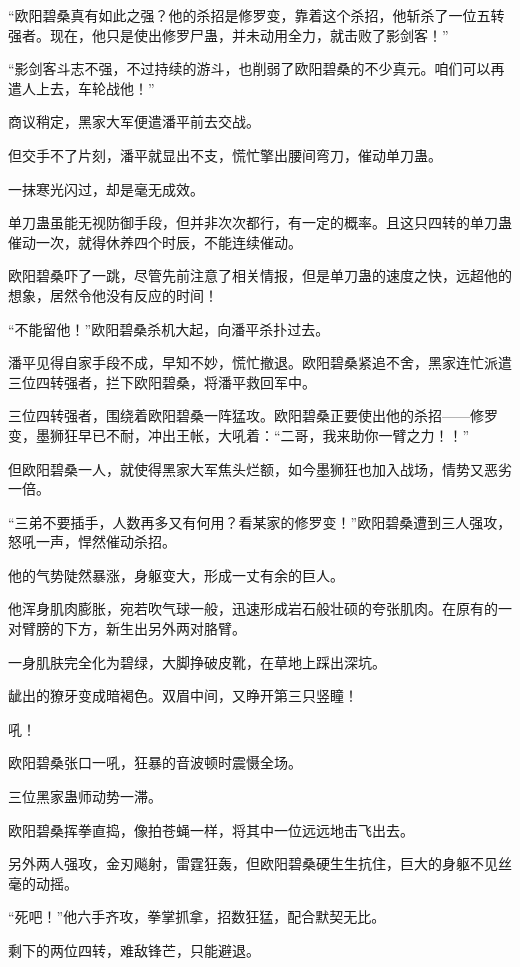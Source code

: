 \begin{this_body}
“欧阳碧桑真有如此之强？他的杀招是修罗变，靠着这个杀招，他斩杀了一位五转强者。现在，他只是使出修罗尸蛊，并未动用全力，就击败了影剑客！”

“影剑客斗志不强，不过持续的游斗，也削弱了欧阳碧桑的不少真元。咱们可以再遣人上去，车轮战他！”

商议稍定，黑家大军便遣潘平前去交战。

但交手不了片刻，潘平就显出不支，慌忙擎出腰间弯刀，催动单刀蛊。

一抹寒光闪过，却是毫无成效。

单刀蛊虽能无视防御手段，但并非次次都行，有一定的概率。且这只四转的单刀蛊催动一次，就得休养四个时辰，不能连续催动。

欧阳碧桑吓了一跳，尽管先前注意了相关情报，但是单刀蛊的速度之快，远超他的想象，居然令他没有反应的时间！

“不能留他！”欧阳碧桑杀机大起，向潘平杀扑过去。

潘平见得自家手段不成，早知不妙，慌忙撤退。欧阳碧桑紧追不舍，黑家连忙派遣三位四转强者，拦下欧阳碧桑，将潘平救回军中。

三位四转强者，围绕着欧阳碧桑一阵猛攻。欧阳碧桑正要使出他的杀招——修罗变，墨狮狂早已不耐，冲出王帐，大吼着：“二哥，我来助你一臂之力！！”

但欧阳碧桑一人，就使得黑家大军焦头烂额，如今墨狮狂也加入战场，情势又恶劣一倍。

“三弟不要插手，人数再多又有何用？看某家的修罗变！”欧阳碧桑遭到三人强攻，怒吼一声，悍然催动杀招。

他的气势陡然暴涨，身躯变大，形成一丈有余的巨人。

他浑身肌肉膨胀，宛若吹气球一般，迅速形成岩石般壮硕的夸张肌肉。在原有的一对臂膀的下方，新生出另外两对胳臂。

一身肌肤完全化为碧绿，大脚挣破皮靴，在草地上踩出深坑。

龇出的獠牙变成暗褐色。双眉中间，又睁开第三只竖瞳！

吼！

欧阳碧桑张口一吼，狂暴的音波顿时震慑全场。

三位黑家蛊师动势一滞。

欧阳碧桑挥拳直捣，像拍苍蝇一样，将其中一位远远地击飞出去。

另外两人强攻，金刃飚射，雷霆狂轰，但欧阳碧桑硬生生抗住，巨大的身躯不见丝毫的动摇。

“死吧！”他六手齐攻，拳掌抓拿，招数狂猛，配合默契无比。

剩下的两位四转，难敌锋芒，只能避退。


\end{this_body}
